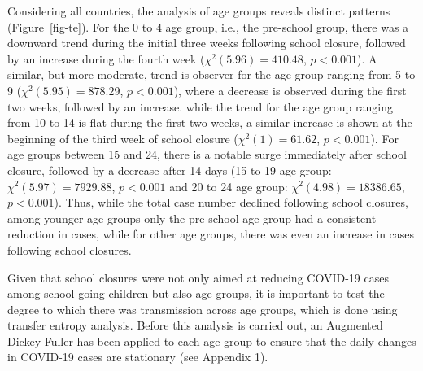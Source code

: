 \documentclass[Harvard,Times1COL]{WileyNJDv5}
\begin{document}
{Considering all countries, the analysis of age groups reveals distinct
patterns (Figure~\ref{fig-te}). For the 0 to 4 age group, i.e., the
pre-school group, there was a downward trend during the initial three
weeks following school closure, followed by an increase during the
fourth week (\(\chi^2(5.96) = 410.48\), \(p < 0.001\)). A similar, but
more moderate, trend is observer for the age group ranging from 5 to 9
(\(\chi^2(5.95) = 878.29\), \(p < 0.001\)), where a decrease is observed
during the first two weeks, followed by an increase. while the trend for
the age group ranging from 10 to 14 is flat during the first two weeks,
a similar increase is shown at the beginning of the third week of school
closure (\(\chi^2(1) = 61.62\), \(p < 0.001\)). For age groups between
15 and 24, there is a notable surge immediately after school closure,
followed by a decrease after 14 days (15 to 19 age group:
\(\chi^2(5.97) = 7929.88\), \(p < 0.001\) and 20 to 24 age group:
\(\chi^2(4.98) = 18386.65\), \(p < 0.001\)). Thus, while the total case
number declined following school closures, among younger age groups only
the pre-school age group had a consistent reduction in cases, while for
other age groups, there was even an increase in cases following school
closures.

Given that school closures were not only aimed at reducing COVID-19
cases among school-going children but also age groups, it is important
to test the degree to which there was transmission across age groups,
which is done using transfer entropy analysis. Before this analysis is
carried out, an Augmented Dickey-Fuller has been applied to each age
group to ensure that the daily changes in COVID-19 cases are stationary
(see Appendix 1).

}
\end{document}
